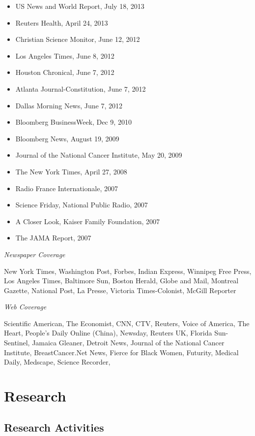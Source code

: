 \documentclass[
  letterpaper,
  DIV=11,
  numbers=noendperiod]{scrartcl}
\begin{document}
\begin{itemize}
\item
  US News and World Report, July 18, 2013
\item
  Reuters Health, April 24, 2013
\item
  Christian Science Monitor, June 12, 2012
\item
  Los Angeles Times, June 8, 2012
\item
  Houston Chronical, June 7, 2012
\item
  Atlanta Journal-Constitution, June 7, 2012
\item
  Dallas Morning News, June 7, 2012
\item
  Bloomberg BusinessWeek, Dec 9, 2010
\item
  Bloomberg News, August 19, 2009
\item
  Journal of the National Cancer Institute, May 20, 2009
\item
  The New York Times, April 27, 2008
\item
  Radio France Internationale, 2007
\item
  Science Friday, National Public Radio, 2007
\item
  A Closer Look, Kaiser Family Foundation, 2007
\item
  The JAMA Report, 2007
\end{itemize}

\emph{Newspaper Coverage}

New York Times, Washington Post, Forbes, Indian Express, Winnipeg Free
Press, Los Angeles Times, Baltimore Sun, Boston Herald, Globe and Mail,
Montreal Gazette, National Post, La Presse, Victoria Times-Colonist,
McGill Reporter

\emph{Web Coverage}

Scientific American, The Economist, CNN, CTV, Reuters, Voice of America,
The Heart, People's Daily Online (China), Newsday, Reuters UK, Florida
Sun-Sentinel, Jamaica Gleaner, Detroit News, Journal of the National
Cancer Institute, BreastCancer.Net News, Fierce for Black Women,
Futurity, Medical Daily, Medscape, Science Recorder,

\section{Research}\label{research}

\subsection{Research Activities}\label{research-activities}
\end{document}

